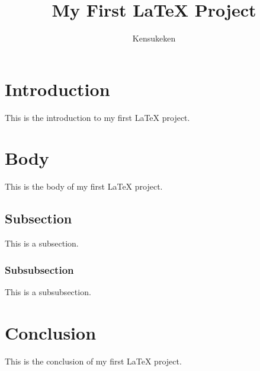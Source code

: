 \documentclass{article}
\begin{document}
\title{My First LaTeX Project}
\author{Kensukeken}

\maketitle

\section{Introduction}

This is the introduction to my first LaTeX project.

\section{Body}

This is the body of my first LaTeX project.

\subsection{Subsection}

This is a subsection.

\subsubsection{Subsubsection}

This is a subsubsection.

\section{Conclusion}

This is the conclusion of my first LaTeX project.
\end{document}
